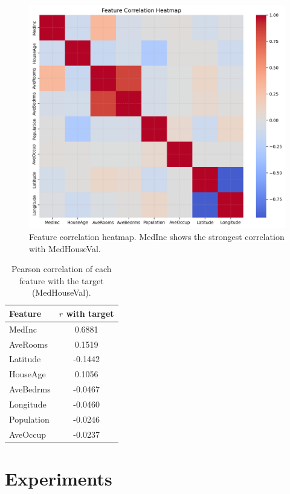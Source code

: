 \documentclass[runningheads]{llncs}
\begin{document}
\begin{figure}[H]
  \centering
  \includegraphics[width=0.95\linewidth]{data/Phase 2 Correlation.png}
  \caption{Feature correlation heatmap. MedInc shows the strongest correlation with MedHouseVal.}
  \label{fig:phase2-corr}
\end{figure}

\begin{table}[H]
  \centering
  \caption{Pearson correlation of each feature with the target (MedHouseVal).}
  \label{tab:corr-target}
  \begin{tabular}{lc}
    \toprule
    Feature & $r$ with target \\
    \midrule
    MedInc    & 0.6881 \\
    AveRooms  & 0.1519 \\
    Latitude  & -0.1442 \\
    HouseAge  & 0.1056 \\
    AveBedrms & -0.0467 \\
    Longitude & -0.0460 \\
    Population& -0.0246 \\
    AveOccup  & -0.0237 \\
    \bottomrule
  \end{tabular}
\end{table}

\section{Experiments}
\end{document}
